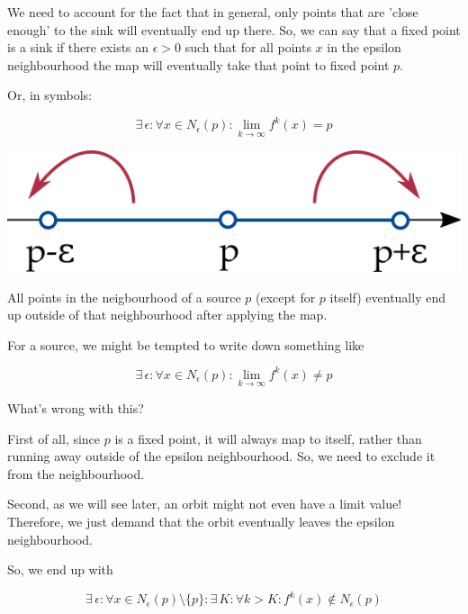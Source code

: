 We need to account for the fact that in general, only points that are 'close enough' to the sink will eventually end up there. So, we can say that a fixed point is a sink if there exists an $\epsilon > 0$ such that for all points $x$ in the epsilon neighbourhood the map will eventually take that point to fixed point $p$.

Or, in symbols:

\begin{equation}
\exists \, \epsilon : \forall x \in  N_\epsilon(p) : \lim_{k \to \infty} f^k(x) = p
\end{equation}

\begin{marginfigure}
\centering
\includegraphics{dynamic/figures/source}
\caption{All points in the neigbourhood of a source $p$ (except for $p$ itself) eventually end up outside of that neighbourhood after applying the map.}
\label{fig-source}
\end{marginfigure}

For a source, we might be tempted to write down something like

\begin{equation}
    \exists \, \epsilon : \forall x \in  N_\epsilon(p) : \lim_{k \to \infty} f^k(x) \ne p
\end{equation}

\begin{cue}
What's wrong with this?
\end{cue}

First of all, since $p$ is a fixed point, it will always map to itself, rather than running away outside of the epsilon neighbourhood. So, we need to exclude it from the neighbourhood.

Second, as we will see later, an orbit might not even have a limit value! Therefore, we just demand that the orbit eventually leaves the epsilon neighbourhood.

So, we end up with

\begin{equation}
\exists \, \epsilon : \forall x \in  N_\epsilon(p) \setminus \{p\} : \exists \, K : \forall k > K : f^k(x) \notin  N_\epsilon(p)
\end{equation}


